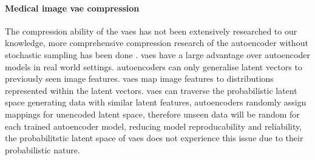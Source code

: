 \documentclass[review]{elsarticle}
\begin{document}

\paragraph{Medical image \gls{vae} compression} The compression ability of the \glspl{vae} has not been extensively researched to our knowledge, more comprehensive compression research of the \gls{autoencoder} without stochastic sampling has been done \cite{xu_stacked_2016, roy_convolutional_2021, fassler_deep_2020}. \glspl{vae} have a large advantage over \gls{autoencoder} models in real world settings. \glspl{autoencoder} can only generalise latent vectors to previously seen image features. \glspl{vae} map image features to distributions represented within the latent vectors. \glspl{vae} can traverse the probabilistic latent space generating data with similar latent features, \glspl{autoencoder} randomly assign mappings for unencoded latent space, therefore unseen data will be random for each trained \gls{autoencoder} model, reducing model reproducability and reliability, the probabilitstic latent space of \glspl{vae} does not experience this issue due to their probabilistic nature.

\end{document}
